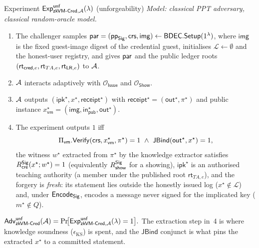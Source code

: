 \begin{gamebox}{Experiment $\mathsf{Exp}^{\mathsf{unf}}_{\mathsf{zkVM\text{-}Cred},\mathcal{A}}(\lambda)$ (unforgeability)}
    \emph{Model: classical PPT adversary, classical random-oracle model.}\par\smallskip
    \begin{enumerate}
        \item The challenger samples $\mathsf{par}=(\mathsf{pp}_{\mathsf{Sig}},\mathsf{crs},\mathsf{img})\leftarrow\mathsf{BDEC}.\mathsf{Setup}(1^\lambda)$, where $\mathsf{img}$ is the fixed guest-image digest of the credential guest, initialises $\mathcal L\gets\emptyset$ and the honest-user registry, and gives $\mathsf{par}$ and the public ledger roots $(\mathsf{rt}_{\mathsf{cred},e},\mathsf{rt}_{TA,e},\mathsf{rt}_{\mathsf{LR},e})$ to $\mathcal{A}$.
        \item $\mathcal{A}$ interacts adaptively with $\mathcal O_{\mathsf{Issue}}$ and $\mathcal O_{\mathsf{Show}}$.
        \item $\mathcal{A}$ outputs $(\mathsf{ipk}^\star,x^\star,\mathsf{receipt}^\star)$ with $\mathsf{receipt}^\star=(\mathsf{out}^\star,\pi^\star)$ and public instance $x_{\mathsf{vm}}^\star=(\mathsf{img},\mathsf{in}_{\mathsf{pub}}^\star,\mathsf{out}^\star)$.
        \item The experiment outputs $1$ iff
        \begin{equation*}
          \Pi_{\mathsf{vm}}.\mathsf{Verify}(\mathsf{crs}, x_{\mathsf{vm}}^\star, \pi^\star)=1
          \ \land\
          \mathsf{JBind}(\mathsf{out}^\star,x^\star)=1,
        \end{equation*}
        the witness $w^\star$ extracted from $\pi^\star$ by the knowledge extractor satisfies $R_{\mathsf{cre}}^{\mathsf{Sig}}(x^\star;w^\star)=1$ (equivalently $R_{\mathsf{show}}^{\mathsf{Sig}}$ for a showing), $\mathsf{ipk}^\star$ is an authorised teaching authority (a member under the published root $\mathsf{rt}_{TA,e}$), and the forgery is \emph{fresh}: its statement lies outside the honestly issued log ($x^\star\notin\mathcal L$) and, under $\mathsf{Encode}_{\mathsf{Sig}}$, encodes a message never signed for the implicated key ($m^\star\notin Q$).
    \end{enumerate}
    $\displaystyle
    \mathsf{Adv}^{\mathsf{unf}}_{\mathsf{zkVM\text{-}Cred}}(\mathcal{A})=\Pr\!\bigl[\mathsf{Exp}^{\mathsf{unf}}_{\mathsf{zkVM\text{-}Cred},\mathcal{A}}(\lambda)=1\bigr].$ The extraction step in~4 is where knowledge soundness ($\epsilon_{\mathrm{KS}}$) is spent, and the $\mathsf{JBind}$ conjunct is what pins the extracted $x^\star$ to a committed statement.
\end{gamebox}

